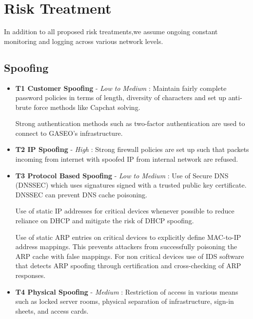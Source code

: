 \documentclass[12pt]{article}
\begin{document}
\section{Risk Treatment}\label{Sec: Treatment}

In addition to all proposed risk treatments,we assume ongoing constant monitoring and logging across various network levels.

\subsection{Spoofing}
\begin{itemize}
    \item \textbf{T1 Customer Spoofing} - \textit{Low to Medium} : Maintain fairly complete password policies in terms of length, diversity of characters and set up anti-brute force methods like Capchat solving.

    Strong authentication methods such as two-factor authentication are used to connect to GASEO's infrastructure.
    \item \textbf{T2 IP Spoofing} - \textit{High} : Strong firewall policies are set up such that packets incoming from internet with spoofed IP from internal network are refused.
    \item \textbf{T3 Protocol Based Spoofing} - \textit{Low to Medium} : Use of Secure DNS (DNSSEC) which uses signatures signed with a trusted public key certificate. DNSSEC can prevent DNS cache poisoning.

    Use of static IP addresses for critical devices whenever possible to reduce reliance on DHCP and mitigate the risk of DHCP spoofing.
    
    Use of static ARP entries on critical devices to explicitly define MAC-to-IP address mappings. This prevents attackers from successfully poisoning the ARP cache with false mappings. For non critical devices use of IDS software that detects ARP spoofing through certification and cross-checking of ARP responses. 

    \item \textbf{T4 Physical Spoofing} - \textit{Medium} : Restriction of access in various means such as locked server rooms, physical separation of infrastructure, sign-in sheets, and access cards. 
\end{itemize}
\end{document}

